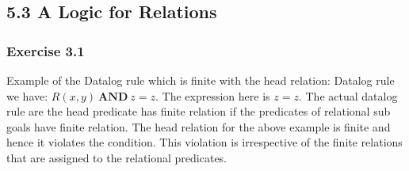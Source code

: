 \documentclass[../../main.tex]{subfiles}
\begin{document}
\subsection{5.3 A Logic for Relations}

\subsubsection*{Exercise 3.1}

Example of the Datalog rule which is finite with the head relation:
Datalog rule we have: $R(x, y) \ \mathbf{AND} \ z = z$. The expression
here is $z = z$. The actual datalog rule are the head predicate
has finite relation if the predicates of relational sub goals
have finite relation. The head relation for the above example
is finite and hence it violates the condition. This violation
is irrespective of the finite relations that are assigned to
the relational predicates.
\end{document}
